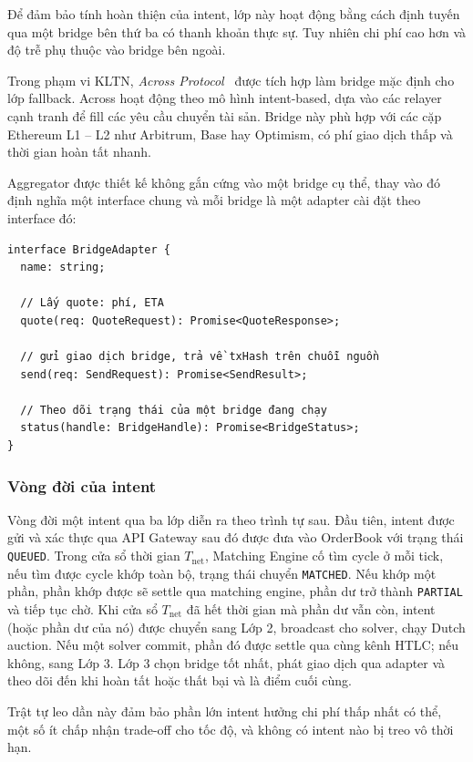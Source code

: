 Để đảm bảo tính hoàn thiện của intent, lớp này hoạt động bằng cách định tuyến qua một bridge
bên thứ ba có thanh khoản thực sự. Tuy nhiên chi phí cao hơn và độ trễ phụ thuộc vào bridge
bên ngoài.

Trong phạm vi KLTN, \textit{Across Protocol}~\cite{across_docs} được tích hợp làm bridge mặc định cho lớp
fallback. Across hoạt động theo mô hình intent-based, dựa vào các relayer cạnh tranh để
fill các yêu cầu chuyển tài sản. Bridge này phù hợp với các cặp Ethereum L1 -- L2
như Arbitrum, Base hay Optimism, có phí giao dịch thấp và thời gian
hoàn tất nhanh.

Aggregator được thiết kế không gắn cứng vào một bridge cụ thể, thay vào đó định nghĩa
một interface chung và mỗi bridge là một adapter cài đặt theo interface đó:

\begin{verbatim}
interface BridgeAdapter {
  name: string;

  // Lấy quote: phí, ETA
  quote(req: QuoteRequest): Promise<QuoteResponse>;

  // gửi giao dịch bridge, trả về txHash trên chuỗi nguồn
  send(req: SendRequest): Promise<SendResult>;

  // Theo dõi trạng thái của một bridge đang chạy
  status(handle: BridgeHandle): Promise<BridgeStatus>;
}
\end{verbatim}

\subsubsection*{Vòng đời của intent}

Vòng đời một intent qua ba lớp diễn ra theo trình tự sau. 
Đầu tiên, intent được gửi và xác thực qua API Gateway sau đó được đưa vào OrderBook với trạng thái \texttt{QUEUED}. 
Trong cửa sổ thời gian $T_{\text{net}}$, 
Matching Engine cố tìm cycle ở mỗi tick, nếu tìm được cycle khớp toàn bộ, 
trạng thái chuyển \texttt{MATCHED}. Nếu khớp một phần, phần khớp được sẽ settle qua matching engine, 
phần dư trở thành \texttt{PARTIAL} và tiếp tục chờ. 
Khi cửa sổ $T_{\text{net}}$ đã hết thời gian mà phần dư vẫn còn, 
intent (hoặc phần dư của nó) được chuyển sang Lớp 2,
broadcast cho solver, chạy Dutch auction. 
Nếu một solver commit, phần đó được settle qua cùng kênh HTLC; 
nếu không, sang Lớp 3. Lớp 3 chọn bridge tốt nhất, 
phát giao dịch qua adapter và theo dõi đến khi hoàn tất hoặc thất bại và là điểm cuối cùng.

Trật tự leo dần này đảm bảo phần lớn intent hưởng chi phí thấp nhất có thể, một số ít chấp nhận trade-off cho tốc độ, và không có intent nào bị treo vô thời hạn.

